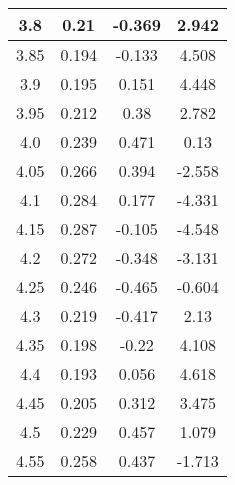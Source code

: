 \begin{multicols}{2}
\begin{longtable}{|c|c|c|c|}
    \hline
    3.8      & 0.21         & -0.369                                 & 2.942                                        \\
    \hline
    3.85     & 0.194        & -0.133                                 & 4.508                                        \\
    \hline
    3.9      & 0.195        & 0.151                                  & 4.448                                        \\
    \hline
    3.95     & 0.212        & 0.38                                   & 2.782                                        \\
    \hline
    4.0      & 0.239        & 0.471                                  & 0.13                                         \\
    \hline
    4.05     & 0.266        & 0.394                                  & -2.558                                       \\
    \hline
    4.1      & 0.284        & 0.177                                  & -4.331                                       \\
    \hline
    4.15     & 0.287        & -0.105                                 & -4.548                                       \\
    \hline
    4.2      & 0.272        & -0.348                                 & -3.131                                       \\
    \hline
    4.25     & 0.246        & -0.465                                 & -0.604                                       \\
    \hline
    4.3      & 0.219        & -0.417                                 & 2.13                                         \\
    \hline
    4.35     & 0.198        & -0.22                                  & 4.108                                        \\
    \hline
    4.4      & 0.193        & 0.056                                  & 4.618                                        \\
    \hline
    4.45     & 0.205        & 0.312                                  & 3.475                                        \\
    \hline
    4.5      & 0.229        & 0.457                                  & 1.079                                        \\
    \hline
    4.55     & 0.258        & 0.437                                  & -1.713                                       \\

\end{longtable}
\end{multicols}
